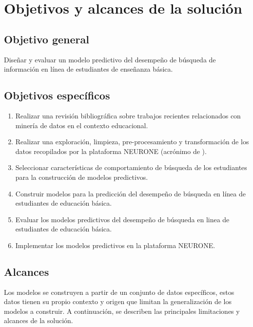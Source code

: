 \section{Objetivos y alcances de la solución}
\label{sec:objetivos}

\subsection{Objetivo general}
\label{subsec:objetivo-general}
Diseñar y evaluar un modelo predictivo del desempeño de búsqueda de información en línea de estudiantes de enseñanza básica.

\subsection{Objetivos específicos}
\label{subsec:objetivo-especificos}

\begin{enumerate}
	\item Realizar una revisión bibliográfica sobre trabajos recientes relacionados con minería de datos en el contexto educacional.
	\item Realizar una exploración, limpieza, pre-procesamiento y transformación de los datos recopilados por la plataforma NEURONE (acrónimo de ).
	\item Seleccionar características de comportamiento de búsqueda de los estudiantes para la construcción de modelos predictivos.
	\item Construir modelos para la predicción del desempeño de búsqueda en línea de estudiantes de educación básica.
	\item Evaluar los modelos predictivos del desempeño de búsqueda en linea de estudiantes de educación básica.
	\item Implementar los modelos predictivos en la plataforma NEURONE.
\end{enumerate}

\subsection{Alcances}
\label{subsec:alcances}
Los modelos se construyen a partir de un conjunto de datos específicos, estos datos tienen su propio contexto y origen que limitan la generalización de los modelos a construir. A continuación, se describen las principales limitaciones y alcances de la solución.

